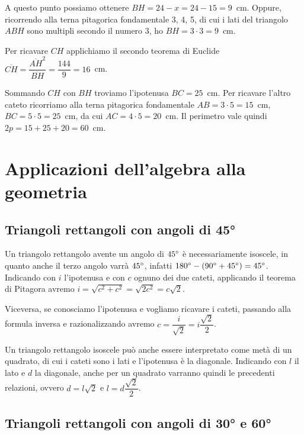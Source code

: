 \begin{exrig}
\begin{esempio}
A questo punto possiamo ottenere $BH = 24-x = 24-15 = 9$~cm. Oppure, ricorrendo alla terna pitagorica fondamentale 3, 4, 5, di cui i lati del triangolo $ABH$ sono multipli secondo il numero 3, ho $BH = 3 \cdot 3 = 9$~cm.

Per ricavare $CH$ applichiamo il secondo teorema di Euclide $\overline{CH}=\dfrac{\overline{AH}^2}{\overline{BH}}=\dfrac{144}{9}=16$~cm.

Sommando $CH$ con $BH$ troviamo l'ipotenusa $BC=25$~cm. Per ricavare l'altro cateto ricorriamo alla terna pitagorica fondamentale $AB=3\cdot 5=15$~cm, $BC=5\cdot 5=25$~cm, da cui $AC=4\cdot 5=20$~cm.
Il perimetro vale quindi $2p=15+25+20=60$~cm.
\end{esempio}
\end{exrig}

\section{Applicazioni dell'algebra alla geometria}

\subsection{Triangoli rettangoli con angoli di 45°}

Un triangolo rettangolo avente un angolo di $45{}^{\circ}$ è necessariamente isoscele, in quanto anche il terzo angolo varrà $45{}^{\circ}$, infatti $180{}^{\circ} - (90{}^{\circ}+45{}^{\circ})=45{}^{\circ}$.
Indicando con $i$ l'ipotenusa e con $c$ ognuno dei due cateti, applicando il teorema di Pitagora avremo $i=\sqrt{c^2+c^2}=\sqrt{2c^2}=c\sqrt{2}$.

Viceversa, se conosciamo l'ipotenusa e vogliamo ricavare i cateti, passando alla formula inversa e razionalizzando avremo $c=\dfrac{i}{\sqrt{2}}=i\dfrac{\sqrt{2}}{2}$.

Un triangolo rettangolo isoscele può anche essere interpretato come metà di un quadrato, di cui i cateti sono i lati e l'ipotenusa è la diagonale.
Indicando con $l$ il lato e $d$ la diagonale, anche per un quadrato varranno quindi le precedenti relazioni, ovvero $d=l\sqrt{2}$ e $l=d\dfrac{\sqrt{2}}{2}$.

\subsection{Triangoli rettangoli con angoli di 30° e 60°}

